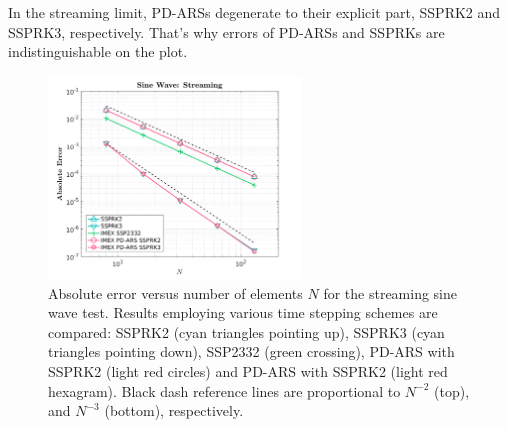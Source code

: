 In the streaming limit, PD-ARSs degenerate to their explicit part, SSPRK2 and SSPRK3, respectively.
That's why errors of PD-ARSs and SSPRKs are indistinguishable on the plot.

\begin{figure}[h]
  \centering
    \includegraphics[width=0.6\textwidth]{figures/SineWaveStreaming}
   \caption{Absolute error versus number of elements $N$ for the streaming sine wave test.  Results employing various time stepping schemes are compared: SSPRK2 (cyan triangles pointing up), SSPRK3 (cyan triangles pointing down), SSP2332 (green crossing), PD-ARS with SSPRK2 (light red circles) and PD-ARS with SSPRK2 (light red hexagram). Black dash reference lines are proportional to $N^{-2}$ (top), and $N^{-3}$ (bottom), respectively.}
   \label{fig: SineWaveStreaming}
\end{figure}

